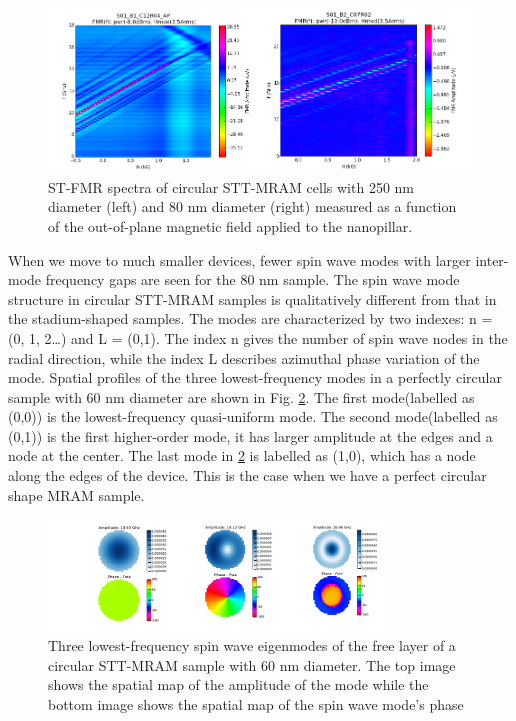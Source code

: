  \begin{figure}[h!]
  \centering
  \includegraphics[width=1\textwidth]{fig/FieldMod/ap-p.png}
   \caption{ST-FMR spectra of circular STT-MRAM cells with 250 nm diameter (left) and 80 nm diameter (right) measured as a function of the out-of-plane magnetic field applied to the nanopillar.}
  \label{fig:apandp}
\end{figure}

When we move to much smaller devices, fewer spin wave modes with larger inter-mode frequency gaps are seen for the 80 nm sample. The spin wave mode structure in circular STT-MRAM samples is qualitatively different from that in the stadium-shaped samples. The modes are characterized by two indexes: n = (0, 1, 2…) and L = (0,1)\cite{excitation2}. The index n gives the number of spin wave nodes in the radial direction, while the index L describes azimuthal phase variation of the mode. Spatial profiles of the three lowest-frequency modes in a perfectly circular sample with 60 nm diameter are shown in Fig. \ref{fig:circularmode}. The first mode(labelled as (0,0)) is the lowest-frequency quasi-uniform mode. The second mode(labelled as (0,1)) is the first higher-order mode, it has larger amplitude at the edges and a node at the center. The last mode in \ref{fig:circularmode} is labelled as (1,0), which has a node along the edges of the device. This is the case when we have a perfect circular shape MRAM sample.
 
\begin{figure}[h!]
  \centering
  \includegraphics[width=0.8\textwidth]{fig/FieldMod/mode-profile.png}
   \caption{Three lowest-frequency spin wave eigenmodes of the free layer of a circular STT-MRAM sample with 60 nm diameter. The top image shows the spatial map of the amplitude of the mode while the bottom image shows the spatial map of the spin wave mode’s phase}
  \label{fig:circularmode}
\end{figure}


